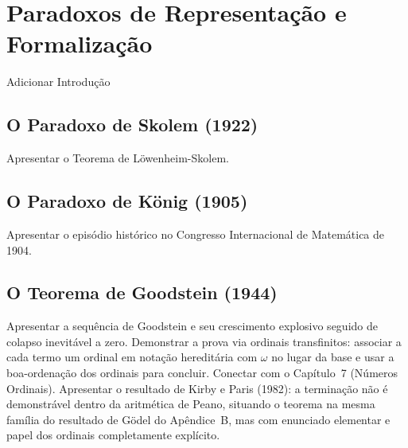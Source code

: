\chapter{Paradoxos de Representação e Formalização}
\label{chap:apendiceRepresentacaoFormalizacao}

Adicionar Introdução

\section{O Paradoxo de Skolem (1922)}

Apresentar o Teorema de Löwenheim-Skolem.


\section{O Paradoxo de König (1905)}

Apresentar o episódio histórico no Congresso Internacional de
Matemática de 1904.


\section{O Teorema de Goodstein (1944)}

Apresentar a sequência de Goodstein e seu crescimento explosivo
seguido de colapso inevitável a zero. Demonstrar a prova via
ordinais transfinitos: associar a cada termo um ordinal em
notação hereditária com \(\omega\) no lugar da base e usar a
boa-ordenação dos ordinais para concluir. Conectar com o
Capítulo~7 (Números Ordinais). Apresentar o resultado de
Kirby e Paris (1982): a terminação não é demonstrável dentro
da aritmética de Peano,
situando o teorema na mesma família do resultado de Gödel
do Apêndice~B, mas com enunciado elementar e papel dos
ordinais completamente explícito.

